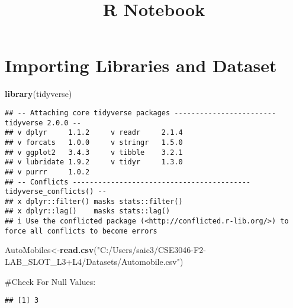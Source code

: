 \documentclass[
]{article}
\title{R Notebook}
\author{}
\date{\vspace{-2.5em}}
\newenvironment{Shaded}{\begin{snugshade}}{\end{snugshade}}
\newcommand{\FunctionTok}[1]{\textcolor[rgb]{0.13,0.29,0.53}{\textbf{#1}}}
\newcommand{\NormalTok}[1]{#1}
\newcommand{\OtherTok}[1]{\textcolor[rgb]{0.56,0.35,0.01}{#1}}
\newcommand{\SpecialCharTok}[1]{\textcolor[rgb]{0.81,0.36,0.00}{\textbf{#1}}}
\newcommand{\StringTok}[1]{\textcolor[rgb]{0.31,0.60,0.02}{#1}}
\begin{document}
\maketitle

\hypertarget{importing-libraries-and-dataset}{%
\section{Importing Libraries and
Dataset}\label{importing-libraries-and-dataset}}

\begin{Shaded}
\begin{Highlighting}[]
\FunctionTok{library}\NormalTok{(tidyverse)}
\end{Highlighting}
\end{Shaded}

\begin{verbatim}
## -- Attaching core tidyverse packages ------------------------ tidyverse 2.0.0 --
## v dplyr     1.1.2     v readr     2.1.4
## v forcats   1.0.0     v stringr   1.5.0
## v ggplot2   3.4.3     v tibble    3.2.1
## v lubridate 1.9.2     v tidyr     1.3.0
## v purrr     1.0.2     
## -- Conflicts ------------------------------------------ tidyverse_conflicts() --
## x dplyr::filter() masks stats::filter()
## x dplyr::lag()    masks stats::lag()
## i Use the conflicted package (<http://conflicted.r-lib.org/>) to force all conflicts to become errors
\end{verbatim}

\begin{Shaded}
\begin{Highlighting}[]
\NormalTok{AutoMobiles}\OtherTok{\textless{}{-}}\FunctionTok{read.csv}\NormalTok{(}\StringTok{"C:/Users/saic3/CSE3046{-}F2{-}LAB\_SLOT\_L3+L4/Datasets/Automobile.csv"}\NormalTok{)}
\end{Highlighting}
\end{Shaded}

\#Check For Null Values:

\begin{Shaded}
\end{Shaded}

\begin{verbatim}
## [1] 3
\end{verbatim}
\end{document}
